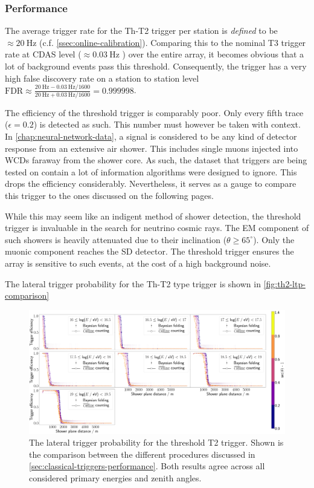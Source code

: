 \subsubsection{Performance}
\label{ssec:th-performance}

The average trigger rate for the Th-T2 trigger per station is \textit{defined} to be $\approx\SI{20}{\hertz}$ (c.f. \autoref{ssec:online-calibration}). Comparing 
this to the nominal T3 trigger rate at CDAS level ($\approx\SI{0.03}{\hertz}$ \cite{abraham2010trigger}) over the entire array, it becomes obvious that a lot of 
background events pass this threshold. Consequently, the trigger has a very high false discovery rate on a station to station level
$\text{FDR}\approx\frac{\SI{20}{\hertz} - \SI{0.03}{\hertz}/1600}{\SI{20}{\hertz} + \SI{0.03}{\hertz}/1600}=0.999998$.

The efficiency of the threshold trigger is comparably poor. Only every fifth trace ($\epsilon = 0.2$) is detected as such. This number must however be taken with 
context. In \autoref{chap:neural-network-data}, a signal is considered to be any kind of detector response from an extensive air shower. This includes single muons
injected into WCDs faraway from the shower core. As such, the dataset that triggers are being tested on contain a lot of information algorithms were designed to 
ignore. This drops the efficiency considerably. Nevertheless, it serves as a gauge to compare this trigger to the ones discussed on the following pages.

While this may seem like an indigent method of shower detection, the threshold trigger is invaluable in the search for neutrino cosmic rays. The EM component of 
such showers is heavily attenuated due to their inclination ($\theta \geq 65^\circ$). Only the muonic component reaches the SD detector. The threshold trigger 
ensures the array is sensitive to such events, at the cost of a high background noise. 

The lateral trigger probability for the Th-T2 type trigger is shown in \autoref{fig:th2-ltp-comparison}

\begin{figure}
	\centering
	\includegraphics[width=\textwidth]{./plots/th2_LTP_comparison.png}
	\caption{The lateral trigger probability for the threshold T2 trigger. Shown is the comparison between the different procedures discussed in 
	\autoref{sec:classical-triggers-performance}. Both results agree across all considered primary energies and zenith angles.} 
	\label{fig:th2-ltp-comparison}
\end{figure}

